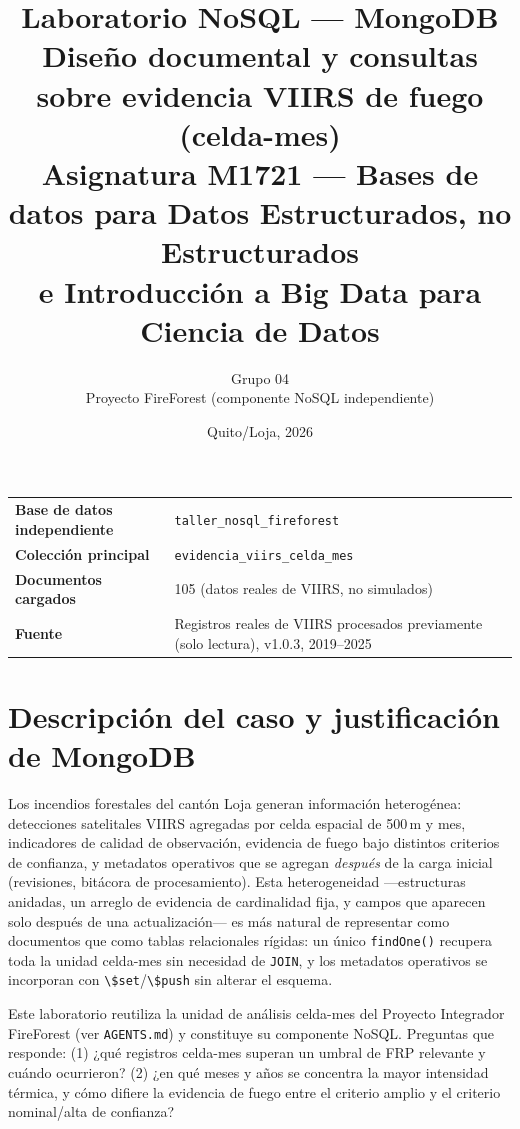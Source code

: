 \documentclass[11pt]{article}
\title{\vspace{-1.5cm}\textbf{\Huge Laboratorio NoSQL --- MongoDB}\\[0.3cm]
\Large Diseño documental y consultas sobre evidencia VIIRS de fuego (celda-mes)\\[0.2cm]
\normalsize Asignatura M1721 --- Bases de datos para Datos Estructurados, no Estructurados\\
e Introducción a Big Data para Ciencia de Datos}
\author{Grupo 04 \\ Proyecto FireForest (componente NoSQL independiente)}
\date{Quito/Loja, 2026}
\begin{document}
\maketitle
\thispagestyle{empty}
\vspace{1cm}
\begin{center}
\begin{tabular}{lp{9cm}}
\toprule
\textbf{Base de datos independiente} & \texttt{taller\_nosql\_fireforest} \\
\textbf{Colección principal} & \texttt{evidencia\_viirs\_celda\_mes} \\
\textbf{Documentos cargados} & 105 (datos reales de VIIRS, no simulados) \\
\textbf{Fuente} & Registros reales de VIIRS procesados previamente (solo lectura), v1.0.3, 2019--2025 \\
\bottomrule
\end{tabular}
\end{center}
\newpage

\section{Descripción del caso y justificación de MongoDB}

Los incendios forestales del cantón Loja generan información heterogénea:
detecciones satelitales VIIRS agregadas por celda espacial de 500\,m y mes,
indicadores de calidad de observación, evidencia de fuego bajo distintos
criterios de confianza, y metadatos operativos que se agregan \emph{después}
de la carga inicial (revisiones, bitácora de procesamiento). Esta
heterogeneidad —estructuras anidadas, un arreglo de evidencia de cardinalidad
fija, y campos que aparecen solo después de una actualización— es más
natural de representar como documentos que como tablas relacionales rígidas:
un único \lstinline!findOne()! recupera toda la unidad celda-mes sin
necesidad de \texttt{JOIN}, y los metadatos operativos se incorporan con
\lstinline!\$set!/\lstinline!\$push! sin alterar el esquema.

Este laboratorio reutiliza la unidad de análisis celda-mes del Proyecto
Integrador FireForest (ver \texttt{AGENTS.md}) y constituye su componente
NoSQL. Preguntas que responde: (1) ¿qué registros celda-mes superan un
umbral de FRP relevante y cuándo ocurrieron? (2) ¿en qué meses y años se
concentra la mayor intensidad térmica, y cómo difiere la evidencia de fuego
entre el criterio amplio y el criterio nominal/alta de confianza?
\end{document}
